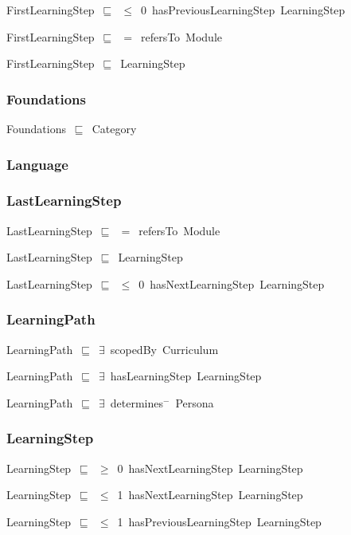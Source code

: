 \documentclass{article}
\begin{document}
FirstLearningStep~\ensuremath{\sqsubseteq}~\ensuremath{\leq}~0~hasPreviousLearningStep~LearningStep~

FirstLearningStep~\ensuremath{\sqsubseteq}~\ensuremath{=}~refersTo~Module~

FirstLearningStep~\ensuremath{\sqsubseteq}~LearningStep~

\subsubsection*{Foundations}

Foundations~\ensuremath{\sqsubseteq}~Category~

\subsubsection*{Language}

\subsubsection*{LastLearningStep}

LastLearningStep~\ensuremath{\sqsubseteq}~\ensuremath{=}~refersTo~Module~

LastLearningStep~\ensuremath{\sqsubseteq}~LearningStep~

LastLearningStep~\ensuremath{\sqsubseteq}~\ensuremath{\leq}~0~hasNextLearningStep~LearningStep~

\subsubsection*{LearningPath}

LearningPath~\ensuremath{\sqsubseteq}~\ensuremath{\exists}~scopedBy~Curriculum~

LearningPath~\ensuremath{\sqsubseteq}~\ensuremath{\exists}~hasLearningStep~LearningStep~

LearningPath~\ensuremath{\sqsubseteq}~\ensuremath{\exists}~determines\ensuremath{^-}~Persona~

\subsubsection*{LearningStep}

LearningStep~\ensuremath{\sqsubseteq}~\ensuremath{\geq}~0~hasNextLearningStep~LearningStep~

LearningStep~\ensuremath{\sqsubseteq}~\ensuremath{\leq}~1~hasNextLearningStep~LearningStep~

LearningStep~\ensuremath{\sqsubseteq}~\ensuremath{\leq}~1~hasPreviousLearningStep~LearningStep~
\end{document}
